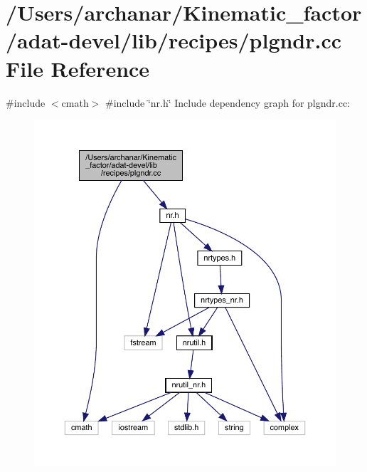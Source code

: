 \hypertarget{adat-devel_2lib_2recipes_2plgndr_8cc}{}\section{/\+Users/archanar/\+Kinematic\+\_\+factor/adat-\/devel/lib/recipes/plgndr.cc File Reference}
\label{adat-devel_2lib_2recipes_2plgndr_8cc}
{\ttfamily \#include $<$cmath$>$}\newline
{\ttfamily \#include \char`\"{}nr.\+h\char`\"{}}\newline
Include dependency graph for plgndr.\+cc\+:
\nopagebreak
\begin{figure}[H]
\begin{center}
\leavevmode
\includegraphics[width=350pt]{d8/d3a/adat-devel_2lib_2recipes_2plgndr_8cc__incl}
\end{center}
\end{figure}
